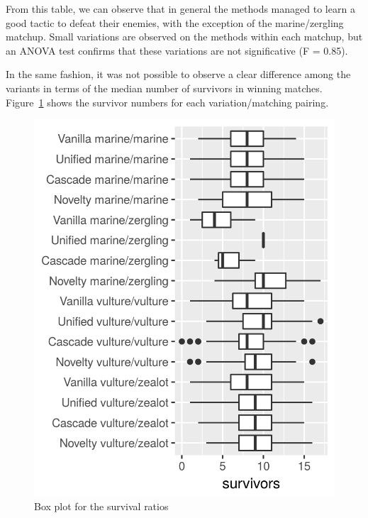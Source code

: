 
From this table, we can observe that in general the methods managed to
learn a good tactic to defeat their enemies, with the exception of the
marine/zergling matchup.
Small variations are observed on the methods within each matchup, but
an ANOVA test confirms that these variations are not significative (F
= 0.85).


In the same fashion, it was not possible to observe a clear difference
among the variants in terms of the median number of survivors in
winning matches. Figure~\ref{fig:survivors} shows the survivor numbers
for each variation/matching pairing.

\begin{figure}
  \includegraphics[width=.5\textwidth]{figures/survivors}
  \caption{Box plot for the survival ratios}\label{fig:survivors}
\end{figure}



